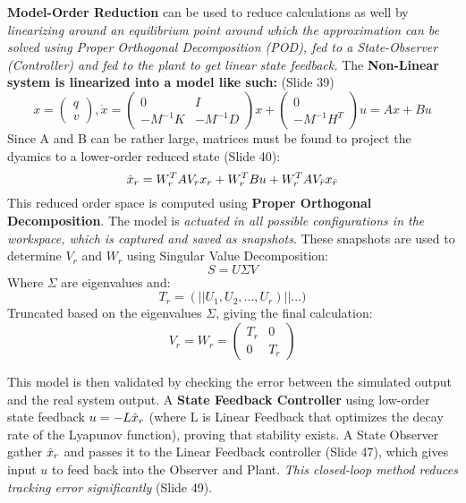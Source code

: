 \documentclass[onecolumn,a4paper]{article}
\begin{document}
 \textbf{Model-Order Reduction} can be used to reduce calculations as well by \emph{linearizing around an equilibrium point around which the approximation can be solved using Proper Orthogonal Decomposition (POD), fed to a State-Observer (Controller) and fed to the plant to get linear state feedback.} The \textbf{Non-Linear system is linearized into a model like such:} (Slide 39)
 \begin{equation}
     x=\left(\begin{array}{cc}
        q \\
        v 
     \end{array}\right), \Dot{x}=\left(\begin{array}{cc}
         0 & I \\
         -M^{-1}K & -M^{-1}D
     \end{array}\right) x+\left(\begin{array}{cc}
        0 \\
        -M^{-1}H^T 
     \end{array}\right) u = Ax + Bu
 \end{equation}
 Since A and B can be rather large, matrices must be found to project the dyamics to a lower-order reduced state (Slide 40):
 \begin{equation}
     \Dot{x}_r=W_r^TAV_rx_r+W_r^TBu+W_r^TAV_{\Bar{r}}x_{\Bar{r}}
 \end{equation}
 This reduced order space is computed using \textbf{Proper Orthogonal Decomposition}. The model is \emph{actuated in all possible configurations in the workspace, which is captured and saved as snapshots}. These snapshots are used to determine $V_r$ and $W_r$ using Singular Value Decomposition:
 \begin{equation}
     S=U\Sigma V
 \end{equation}
 Where $\Sigma$ are eigenvalues and:
 \begin{equation}
     T_r=(||U_1, U_2, ..., U_r)||...)
 \end{equation}
 Truncated based on the eigenvalues $\Sigma$, giving the final calculation:
 \begin{equation}
     V_r = W_r = \left(\begin{array}{cc}
         T_r & 0 \\
         0 & T_r
     \end{array} \right)
 \end{equation}

This model is then validated by checking the error between the simulated output and the real system output. A \textbf{State Feedback Controller} using low-order state feedback $u=-L\Hat{x}_r$ (where L is Linear Feedback that optimizes the decay rate of the Lyapunov function), proving that stability exists. A State Observer gather $\Hat{x}_r$ and passes it to the Linear Feedback controller (Slide 47), which gives input $u$ to feed back into the Observer and Plant. \emph{This closed-loop method reduces tracking error significantly} (Slide 49).
\end{document}
